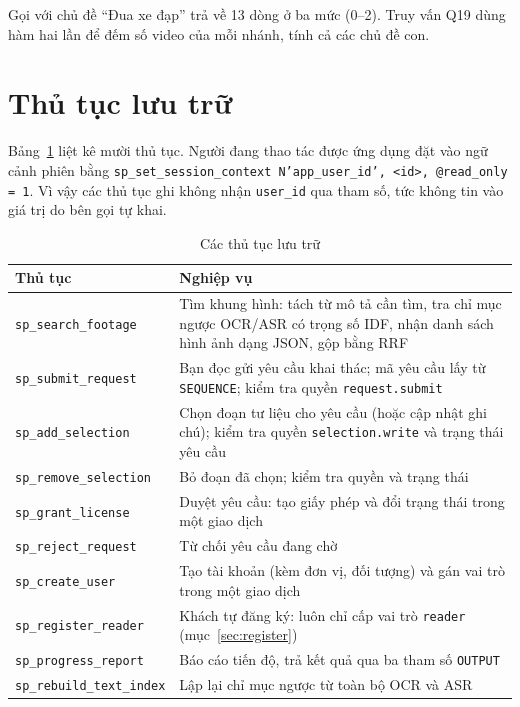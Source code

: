 Gọi với chủ đề ``Đua xe đạp'' trả về 13 dòng ở ba mức (0--2). Truy vấn Q19 dùng hàm hai lần
để đếm số video của mỗi nhánh, tính cả các chủ đề con.

\section{Thủ tục lưu trữ}

Bảng~\ref{tab:procedures} liệt kê mười thủ tục. Người đang thao tác được ứng dụng đặt vào
ngữ cảnh phiên bằng \texttt{sp\_set\_session\_context N'app\_user\_id', <id>, @read\_only = 1}.
Vì vậy các thủ tục ghi không nhận \texttt{user\_id} qua tham số, tức không tin vào giá trị do
bên gọi tự khai.

\begin{table}[H]
\centering
\caption{Các thủ tục lưu trữ}
\label{tab:procedures}
\renewcommand{\arraystretch}{1.15}
\begin{tabularx}{\textwidth}{>{\raggedright\arraybackslash}p{4.3cm} >{\raggedright\arraybackslash}X}
\toprule
\textbf{Thủ tục} & \textbf{Nghiệp vụ} \\
\midrule
\texttt{sp\_search\_footage} & Tìm khung hình: tách từ mô tả cần tìm, tra chỉ mục ngược OCR/ASR có trọng số IDF, nhận danh sách hình ảnh dạng JSON, gộp bằng RRF \\
\texttt{sp\_submit\_request} & Bạn đọc gửi yêu cầu khai thác; mã yêu cầu lấy từ \texttt{SEQUENCE}; kiểm tra quyền \texttt{request.submit} \\
\texttt{sp\_add\_selection} & Chọn đoạn tư liệu cho yêu cầu (hoặc cập nhật ghi chú); kiểm tra quyền \texttt{selection.write} và trạng thái yêu cầu \\
\texttt{sp\_remove\_selection} & Bỏ đoạn đã chọn; kiểm tra quyền và trạng thái \\
\texttt{sp\_grant\_license} & Duyệt yêu cầu: tạo giấy phép và đổi trạng thái trong một giao dịch \\
\texttt{sp\_reject\_request} & Từ chối yêu cầu đang chờ \\
\texttt{sp\_create\_user} & Tạo tài khoản (kèm đơn vị, đối tượng) và gán vai trò trong một giao dịch \\
\texttt{sp\_register\_reader} & Khách tự đăng ký: luôn chỉ cấp vai trò \texttt{reader} (mục~\ref{sec:register}) \\
\texttt{sp\_progress\_report} & Báo cáo tiến độ, trả kết quả qua ba tham số \texttt{OUTPUT} \\
\texttt{sp\_rebuild\_text\_index} & Lập lại chỉ mục ngược từ toàn bộ OCR và ASR \\
\bottomrule
\end{tabularx}
\end{table}

